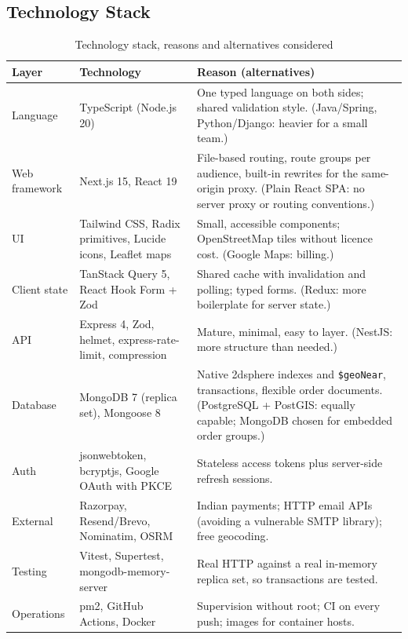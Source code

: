 \documentclass[manuscript,screen,review]{acmart}
\begin{document}
\subsection{Technology Stack}

\begin{table}[htbp]
  \caption{Technology stack, reasons and alternatives considered}
  \label{tab:stack}
  \small
  \begin{tabularx}{\columnwidth}{@{}p{}p{}L@{}}
    \toprule
    \textbf{Layer} & \textbf{Technology} & \textbf{Reason (alternatives)} \\
    \midrule
    Language & TypeScript (Node.js 20) & One typed language on both sides; shared validation style. (Java/Spring, Python/Django: heavier for a small team.) \\
    Web framework & Next.js 15, React 19 & File-based routing, route groups per audience, built-in rewrites for the same-origin proxy. (Plain React SPA: no server proxy or routing conventions.) \\
    UI & Tailwind CSS, Radix primitives, Lucide icons, Leaflet maps & Small, accessible components; OpenStreetMap tiles without licence cost. (Google Maps: billing.) \\
    Client state & TanStack Query 5, React Hook Form + Zod & Shared cache with invalidation and polling; typed forms. (Redux: more boilerplate for server state.) \\
    API & Express 4, Zod, helmet, express-rate-limit, compression & Mature, minimal, easy to layer. (NestJS: more structure than needed.) \\
    Database & MongoDB 7 (replica set), Mongoose 8 & Native 2dsphere indexes and \texttt{\$geoNear}, transactions, flexible order documents. (PostgreSQL + PostGIS: equally capable; MongoDB chosen for embedded order groups.) \\
    Auth & jsonwebtoken, bcryptjs, Google OAuth with PKCE & Stateless access tokens plus server-side refresh sessions. \\
    External & Razorpay, Resend/Brevo, Nominatim, OSRM & Indian payments; HTTP email APIs (avoiding a vulnerable SMTP library); free geocoding. \\
    Testing & Vitest, Supertest, mongodb-memory-server & Real HTTP against a real in-memory replica set, so transactions are tested. \\
    Operations & pm2, GitHub Actions, Docker & Supervision without root; CI on every push; images for container hosts. \\
    \bottomrule
  \end{tabularx}
\end{table}
\end{document}

